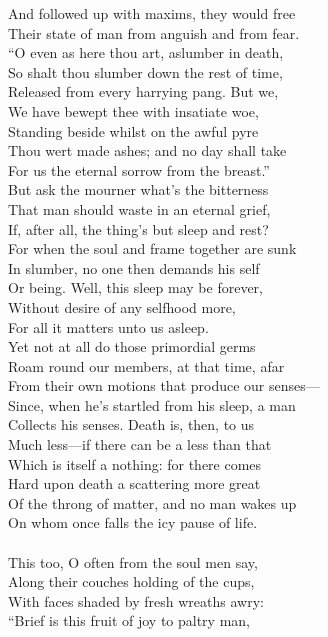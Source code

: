 And followed up with maxims, they would free\\
Their state of man from anguish and from fear.\\
``O even as here thou art, aslumber in death,\\
So shalt thou slumber down the rest of time,\\
Released from every harrying pang. But we,\\
We have bewept thee with insatiate woe,\\
Standing beside whilst on the awful pyre\\
Thou wert made ashes; and no day shall take\\
For us the eternal sorrow from the breast.''\\
But ask the mourner what's the bitterness\\
That man should waste in an eternal grief,\\
If, after all, the thing's but sleep and rest?\\
For when the soul and frame together are sunk\\
In slumber, no one then demands his self\\
Or being. Well, this sleep may be forever,\\
Without desire of any selfhood more,\\
For all it matters unto us asleep.\\
Yet not at all do those primordial germs\\
Roam round our members, at that time, afar\\
From their own motions that produce our senses—\\
Since, when he's startled from his sleep, a man\\
Collects his senses. Death is, then, to us\\
Much less—if there can be a less than that\\
Which is itself a nothing: for there comes\\
Hard upon death a scattering more great\\
Of the throng of matter, and no man wakes up\\
On whom once falls the icy pause of life.\\
\\
This too, O often from the soul men say,\\
Along their couches holding of the cups,\\
With faces shaded by fresh wreaths awry:\\
``Brief is this fruit of joy to paltry man,\\
